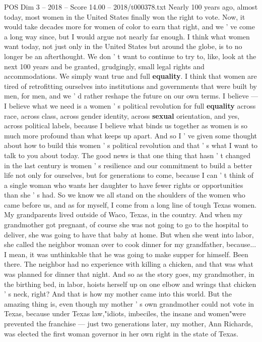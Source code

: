 \begin{textsample}{POS Dim 3 – 2018 – Score 14.00 – 2018/t000378.txt}  \label{ex:f3_pos_017}
Nearly 100 years ago, almost today, most women in the United States finally won the right to vote.
Now, it would take decades more for women of color to earn that right, and we ' ve come a long way since, but I would argue not nearly far enough.
I think what women want today, not just only in the United States but around the globe, is to no longer be an afterthought.
We don ' t want to continue to try to, like, look at the next 100 years and be granted, grudgingly, small legal rights and accommodations.
We simply want true and full \textbf{equality}.
I think that women are tired of retrofitting ourselves into institutions and governments that were built by men, for men, and we ' d rather reshape the future on our own terms.
I believe — I believe what we need is a women ' s political revolution for full \textbf{equality} across race, across class, across gender identity, across \textbf{sexual} orientation, and yes, across political labels, because I believe what binds us together as women is so much more profound than what keeps up apart.
And so I ' ve given some thought about how to build this women ' s political revolution and that ' s what I want to talk to you about today.
The good news is that one thing that hasn ' t changed in the last century is women ' s resilience and our commitment to build a better life not only for ourselves, but for generations to come, because I can ' t think of a single woman who wants her daughter to have fewer rights or opportunities than she ' s had.
So we know we all stand on the shoulders of the women who came before us, and as for myself, I come from a long line of tough Texas women.
My grandparents lived outside of Waco, Texas, in the country.
And when my grandmother got pregnant, of course she was not going to go to the hospital to deliver, she was going to have that baby at home.
But when she went into labor, she called the neighbor woman over to cook dinner for my grandfather, because...
I mean, it was unthinkable that he was going to make supper for himself.
Been there.
The neighbor had no experience with killing a chicken, and that was what was planned for dinner that night.
And so as the story goes, my grandmother, in the birthing bed, in labor, hoists herself up on one elbow and wrings that chicken ' s neck, right?
And that is how my mother came into this world.
But the amazing thing is, even though my mother ' s own grandmother could not vote in Texas, because under Texas law,"idiots, imbeciles, the insane and women"were prevented the franchise — just two generations later, my mother, Ann Richards, was elected the first woman governor in her own right in the state of Texas.

\end{textsample}
